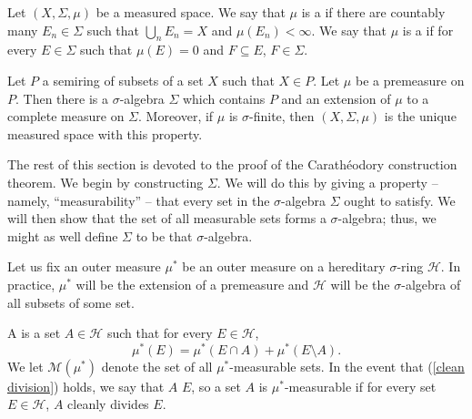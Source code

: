 \begin{definition}
Let $(X, \Sigma, \mu)$ be a measured space.
We say that $\mu$ is a  if there are countably many $E_{n} \in \Sigma$ such that $\bigcup_{n} E_{n} = X$ and $\mu(E_{n}) < \infty$.
We say that $\mu$ is a  if for every $E \in \Sigma$ such that $\mu(E) = 0$ and $F \subseteq E$, $F \in \Sigma$.
\end{definition}

\begin{theorem}
Let $P$ a semiring of subsets of a set $X$ such that $X \in P$.
Let $\mu$ be a premeasure on $P$.
Then there is a $\sigma$-algebra $\Sigma$ which contains $P$ and an extension of $\mu$ to a complete measure on $\Sigma$.
Moreover, if $\mu$ is $\sigma$-finite, then $(X, \Sigma, \mu)$ is the unique measured space with this property.
\end{theorem}

\begin{subsec}
The rest of this section is devoted to the proof of the Carathéodory construction theorem.
We begin by constructing $\Sigma$.
We will do this by giving a property -- namely, ``measurability'' -- that every set in the $\sigma$-algebra $\Sigma$ ought to satisfy.
We will then show that the set of all measurable sets forms a $\sigma$-algebra; thus, we might as well define $\Sigma$ to be that $\sigma$-algebra.
\end{subsec}

\begin{subsec}
Let us fix an outer measure $\mu^*$ be an outer measure on a hereditary $\sigma$-ring $\mathcal H$.
In practice, $\mu^*$ will be the extension of a premeasure and $\mathcal H$ will be the $\sigma$-algebra of all subsets of some set.
\end{subsec}

\begin{definition}
A  is a set $A \in \mathcal H$ such that for every $E \in \mathcal H$,
\begin{equation}
\label{clean division}
\mu^*(E) = \mu^*(E \cap A) + \mu^*(E \setminus A).
\end{equation}
We let $\mathcal M(\mu^*)$ denote the set of all $\mu^*$-measurable sets.
In the event that (\ref{clean division}) holds, we say that $A$  $E$, so a set $A$ is $\mu^*$-measurable if for every set $E \in \mathcal H$, $A$ cleanly divides $E$.
\end{definition}

